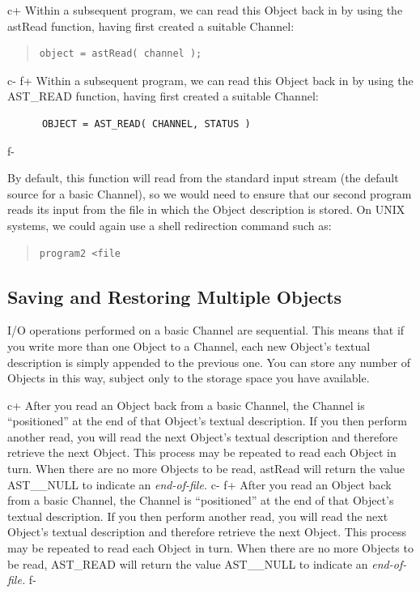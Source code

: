 \documentclass[twoside,11pt]{article}
\begin{document}
c+
Within a subsequent program, we can read this Object back in by
using the astRead function, having first created a suitable
Channel:

\begin{quote}
\small
\begin{verbatim}
object = astRead( channel );
\end{verbatim}
\normalsize
\end{quote}
c-
f+
Within a subsequent program, we can read this Object back in by
using the AST\_READ function, having first created a suitable
Channel:

\small
\begin{verbatim}
      OBJECT = AST_READ( CHANNEL, STATUS )
\end{verbatim}
\normalsize
f-

By default, this function will read from the standard input stream
(the default source for a basic Channel), so we would need to ensure
that our second program reads its input from the file in which the
Object description is stored. On UNIX systems, we could again use a
shell redirection command such as:

\begin{quote}
\small
\begin{verbatim}
program2 <file
\end{verbatim}
\normalsize
\end{quote}

\subsection{Saving and Restoring Multiple Objects}

I/O operations performed on a basic Channel are sequential. This
means that if you write more than one Object to a Channel,
each new Object's textual description is simply appended to the
previous one. You can store any number of Objects in this way,
subject only to the storage space you have available.

c+
After you read an Object back from a basic Channel, the
Channel is ``positioned'' at the end of that Object's
textual description. If you then perform another read, you will
read the next Object's textual description and therefore
retrieve the next Object.  This process may be repeated to read
each Object in turn. When there are no more Objects to be
read, astRead will return the value AST\_\_NULL to indicate an
{\em{end-of-file.}}
c-
f+
After you read an Object back from a basic Channel, the
Channel is ``positioned'' at the end of that Object's
textual description. If you then perform another read, you will
read the next Object's textual description and therefore
retrieve the next Object.  This process may be repeated to read
each Object in turn. When there are no more Objects to be
read, AST\_READ will return the value AST\_\_NULL to indicate an
{\em{end-of-file.}}
f-
\end{document}
